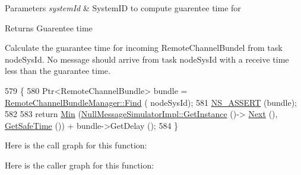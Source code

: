 \begin{DoxyParams}{Parameters}
{\em system\+Id} & System\+ID to compute guarentee time for\\
\hline
\end{DoxyParams}
\begin{DoxyReturn}{Returns}
Guarentee time
\end{DoxyReturn}
Calculate the guarantee time for incoming Remote\+Channel\+Bundel from task node\+Sys\+Id. No message should arrive from task node\+Sys\+Id with a receive time less than the guarantee time. 
\begin{DoxyCode}
579 \{
580   Ptr<RemoteChannelBundle> bundle = \hyperlink{classns3_1_1RemoteChannelBundleManager_a143cfdce189ed68cc0917255ef0b849f}{RemoteChannelBundleManager::Find} (
      nodeSysId);
581   \hyperlink{assert_8h_a6dccdb0de9b252f60088ce281c49d052}{NS\_ASSERT} (bundle);
582 
583   \textcolor{keywordflow}{return} \hyperlink{group__highprec_gacb0b89d5f4363bf77747ff1212f27430}{Min} (\hyperlink{classns3_1_1NullMessageSimulatorImpl_ab5e219b843d754b0e812181af6115a53}{NullMessageSimulatorImpl::GetInstance} ()->
      \hyperlink{classns3_1_1NullMessageSimulatorImpl_ad1e39ec20b291ecad898338eab074d0b}{Next} (), \hyperlink{classns3_1_1NullMessageSimulatorImpl_ac3ac75383c83e269b9258bdb9de097c0}{GetSafeTime} ()) + bundle->GetDelay ();
584 \}
\end{DoxyCode}


Here is the call graph for this function\+:




Here is the caller graph for this function\+:


